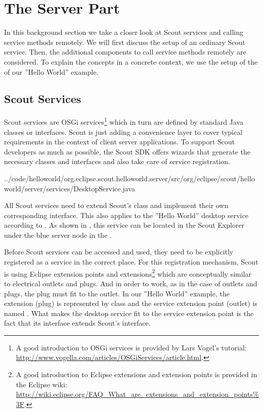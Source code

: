 \documentclass[a4paper,10pt,twoside]{book}
\begin{document}
\section{The Server Part}

In this background section we take a closer look at Scout services and calling service methods remotely.
We will first discuss the setup of an ordinary Scout service.
Then, the additional components to call service methods remotely are considered.
To explain the concepts in a concrete context, we use the setup of the  of our ''Hello World'' example.

\subsection{Scout Services}

Scout services are OSGi services\footnote{
A good introduction to OSGi services is provided by Lars Vogel's tutorial: \url{http://www.vogella.com/articles/OSGiServices/article.html}.
}
which in turn are defined by standard Java classes or interfaces.
Scout is just adding a convenience layer to cover typical requirements in the context of client server applications. 
To support Scout developers as much as possible, the Scout SDK offers wizards that generate the necessary classes and interfaces and also take care of service registration.


{../code/helloworld/org.eclipse.scout.helloworld.server/src/org/eclipse/scout/helloworld/server/services/DesktopService.java}

All Scout services need to extend Scout's  class and implement their own corresponding interface.
This also applies to the ''Hello World'' desktop service according to .
As shown in , this service can be located in the Scout Explorer under the blue server node in the .

Before Scout services can be accessed and used, they need to be explicitly registered as a service in the correct place.
For this registration mechanism, Scout is using Eclipse extension points and extensions\footnote{
A good introduction to Eclipse extensions and extension points is provided in the Eclipse wiki: \url{http://wiki.eclipse.org/FAQ_What_are_extensions_and_extension_points\%3F}.
}
which are conceptually similar to electrical outlets and plugs.
And in order to work, as in the case of outlets and plugs, the plug must fit to the outlet.
In our ''Hello World'' example, the extension (plug) is represented by class  and the service extension point (outlet) is named .
What makes the desktop service fit to the service extension point is the fact that its interface  extends Scout's  interface.
\end{document}
